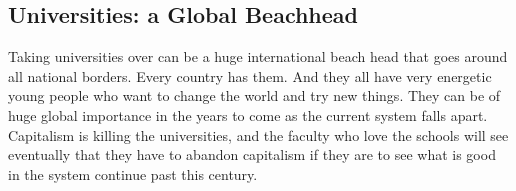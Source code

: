 \subsection{Universities: a Global
Beachhead}\label{universities-a-global-beachhead}

Taking universities over can be a huge international beach head that
goes around all national borders. Every country has them. And they all
have very energetic young people who want to change the world and try
new things. They can be of huge global importance in the years to come
as the current system falls apart. Capitalism is killing the
universities, and the faculty who love the schools will see eventually
that they have to abandon capitalism if they are to see what is good in
the system continue past this century.
